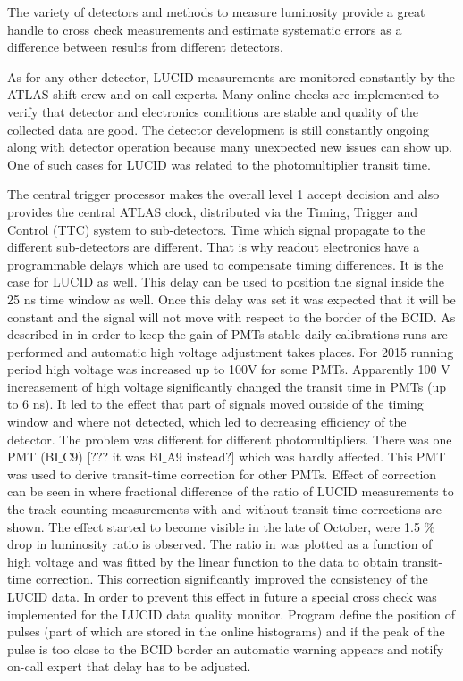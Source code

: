 The variety of detectors and methods to measure luminosity provide a great handle to cross check measurements and estimate systematic errors as a difference between results from different detectors.

As for any other detector, LUCID measurements are monitored constantly by the ATLAS shift crew and on-call experts. 
Many online checks are implemented to verify that detector and electronics conditions are stable and quality of the collected data are good. 
The detector development is still constantly ongoing along with detector operation because many unexpected new issues can show up. 
One of such cases for LUCID was related to the photomultiplier transit time. 

The central trigger processor makes the overall level 1 accept decision and also provides the central ATLAS clock, distributed via the Timing, Trigger and Control (TTC) system to sub-detectors. 
Time which signal propagate to the different sub-detectors are different. That is why readout electronics have a programmable delays which are used to compensate timing differences. It is the case for LUCID as well. 
This delay can be used to position the signal inside the 25 ns time window as well. 
Once this delay was set it was expected that it will be constant and the signal will not move with respect to the border of the BCID. 
As described in  in order to keep the gain of PMTs stable daily calibrations runs are performed and automatic high voltage adjustment takes places. 
For 2015 running period high voltage was increased up to 100V for some PMTs.
Apparently 100 V increasement of high voltage significantly changed the transit time in PMTs (up to 6 ns). 
It led to the effect that part of signals moved outside of the timing window and where not detected, which led to decreasing efficiency of the detector.
The problem was different for different photomultipliers. There was one PMT (BI$\_$C9) [??? it was BI$\_$A9 instead?] which was hardly affected. 
This PMT was used to derive transit-time correction for other PMTs.
Effect of correction can be seen in  where fractional difference of the ratio of LUCID measurements to the track counting measurements with and without transit-time corrections are shown.  
The effect started to become visible in the late of October, were 1.5 $\%$ drop in luminosity ratio is observed.
The ratio in  was plotted as a function of high voltage and was fitted by the linear function to the data to obtain transit-time correction.
This correction significantly improved the consistency of the LUCID data. 
In order to prevent this effect in future a special cross check was implemented for the LUCID data quality monitor.
Program define the position of pulses (part of which are stored in the online histograms) 
and if the peak of the pulse is too close to the BCID border an automatic warning appears and notify on-call expert that delay has to be adjusted.

